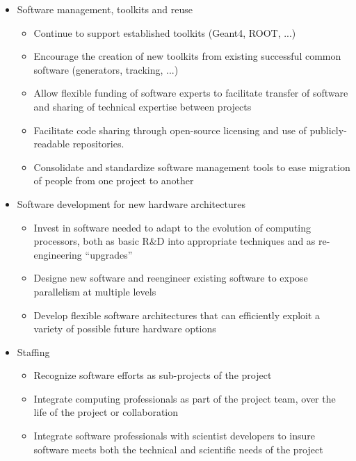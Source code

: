 \begin{itemize}
    \item Software management, toolkits and reuse
    \begin{itemize}
        \item Continue to support established toolkits (Geant4, ROOT, ...)
        \item Encourage the creation of new toolkits from existing successful common software (generators, tracking, ...)
        \item  Allow flexible funding of software experts to facilitate transfer of software and sharing of technical expertise between projects
        \item Facilitate code sharing through open-source licensing and use of publicly-readable repositories.
        \item Consolidate and standardize software management tools to ease
migration of people from one project to another
    \end{itemize}

    \item Software development for new hardware architectures
    \begin{itemize}
        \item Invest in software needed to adapt to the evolution of computing processors, both as basic R\&D into appropriate
techniques and as re-engineering ``upgrades''
        \item Designe new software and reengineer existing software to expose parallelism at multiple levels
        \item Develop flexible software architectures that can efficiently exploit a variety of possible future hardware options
    \end{itemize}    

    \item Staffing
      \begin{itemize}
          \item Recognize software efforts as sub-projects of the project
          \item Integrate computing professionals as part of the project team, over the life of the project or collaboration
          \item Integrate software professionals with scientist developers to insure software meets both the technical and scientific needs of the project
      \end{itemize}


\end{itemize}
